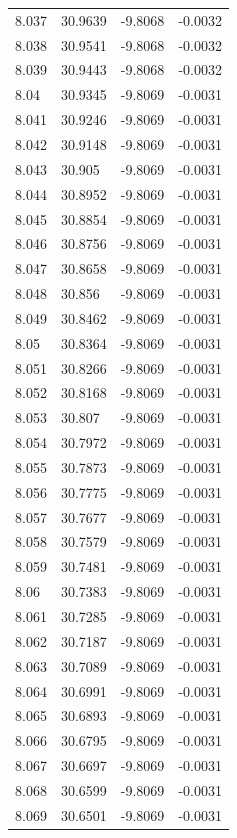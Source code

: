 \begin{tabular}{llll}
8.037 & 30.9639 & -9.8068 & -0.0032 \\
8.038 & 30.9541 & -9.8068 & -0.0032 \\
8.039 & 30.9443 & -9.8068 & -0.0032 \\
8.04 & 30.9345 & -9.8069 & -0.0031 \\
8.041 & 30.9246 & -9.8069 & -0.0031 \\
8.042 & 30.9148 & -9.8069 & -0.0031 \\
8.043 & 30.905 & -9.8069 & -0.0031 \\
8.044 & 30.8952 & -9.8069 & -0.0031 \\
8.045 & 30.8854 & -9.8069 & -0.0031 \\
8.046 & 30.8756 & -9.8069 & -0.0031 \\
8.047 & 30.8658 & -9.8069 & -0.0031 \\
8.048 & 30.856 & -9.8069 & -0.0031 \\
8.049 & 30.8462 & -9.8069 & -0.0031 \\
8.05 & 30.8364 & -9.8069 & -0.0031 \\
8.051 & 30.8266 & -9.8069 & -0.0031 \\
8.052 & 30.8168 & -9.8069 & -0.0031 \\
8.053 & 30.807 & -9.8069 & -0.0031 \\
8.054 & 30.7972 & -9.8069 & -0.0031 \\
8.055 & 30.7873 & -9.8069 & -0.0031 \\
8.056 & 30.7775 & -9.8069 & -0.0031 \\
8.057 & 30.7677 & -9.8069 & -0.0031 \\
8.058 & 30.7579 & -9.8069 & -0.0031 \\
8.059 & 30.7481 & -9.8069 & -0.0031 \\
8.06 & 30.7383 & -9.8069 & -0.0031 \\
8.061 & 30.7285 & -9.8069 & -0.0031 \\
8.062 & 30.7187 & -9.8069 & -0.0031 \\
8.063 & 30.7089 & -9.8069 & -0.0031 \\
8.064 & 30.6991 & -9.8069 & -0.0031 \\
8.065 & 30.6893 & -9.8069 & -0.0031 \\
8.066 & 30.6795 & -9.8069 & -0.0031 \\
8.067 & 30.6697 & -9.8069 & -0.0031 \\
8.068 & 30.6599 & -9.8069 & -0.0031 \\
8.069 & 30.6501 & -9.8069 & -0.0031 \\

\end{tabular}
